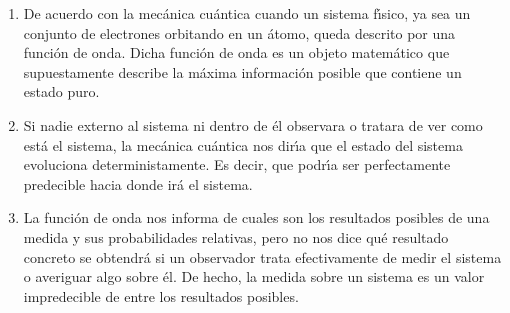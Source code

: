\begin{enumerate}
\item  De acuerdo con la mec\'{a}nica cu\'{a}ntica cuando un sistema f\'{\i}sico, ya sea un conjunto de electrones orbitando en un \'{a}tomo, queda descrito por una funci\'{o}n de onda. Dicha funci\'{o}n de onda es un objeto matem\'{a}tico que supuestamente describe la m\'{a}xima informaci\'{o}n posible que contiene un estado puro.
\item  Si nadie externo al sistema ni dentro de \'{e}l observara o tratara de ver como est\'{a} el sistema, la mec\'{a}nica cu\'{a}ntica nos dir\'{\i}a que el estado del sistema evoluciona deterministamente. Es decir, que podr\'{\i}a ser perfectamente predecible hacia donde ir\'{a} el sistema.
\item  La funci\'{o}n de onda nos informa de cuales son los resultados posibles de una medida y sus probabilidades relativas, pero no nos dice qu\'{e} resultado concreto se obtendr\'{a} si un observador trata efectivamente de medir el sistema o averiguar algo sobre \'{e}l. De hecho, la medida sobre un sistema es un valor impredecible de entre los resultados posibles.


\end{enumerate}
